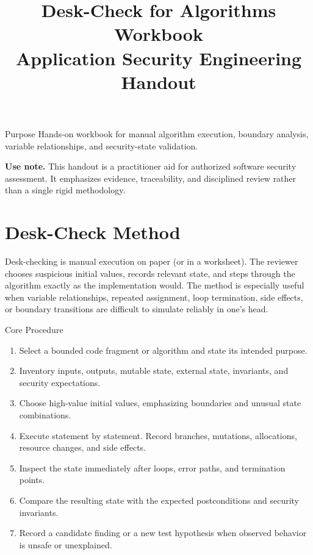 \documentclass[10pt]{article}
\title{\textbf{Desk-Check for Algorithms Workbook}\\\large Application Security Engineering Handout}
\author{}
\date{}
\begin{document}
\maketitle
\thispagestyle{empty}
\begin{keybox}{Purpose}
Hands-on workbook for manual algorithm execution, boundary analysis, variable relationships, and security-state validation.
\end{keybox}
\vfill
\noindent\textbf{Use note.} This handout is a practitioner aid for authorized software security assessment. It emphasizes evidence, traceability, and disciplined review rather than a single rigid methodology.
\newpage
\tableofcontents
\newpage

\section{Desk-Check Method}
Desk-checking is manual execution on paper (or in a worksheet). The reviewer chooses suspicious initial values, records relevant state, and steps through the algorithm exactly as the implementation would. The method is especially useful when variable relationships, repeated assignment, loop termination, side effects, or boundary transitions are difficult to simulate reliably in one's head.

\begin{keybox}{Core Procedure}
\begin{enumerate}
\item Select a bounded code fragment or algorithm and state its intended purpose.
\item Inventory inputs, outputs, mutable state, external state, invariants, and security expectations.
\item Choose high-value initial values, emphasizing boundaries and unusual state combinations.
\item Execute statement by statement. Record branches, mutations, allocations, resource changes, and side effects.
\item Inspect the state immediately after loops, error paths, and termination points.
\item Compare the resulting state with the expected postconditions and security invariants.
\item Record a candidate finding or a new test hypothesis when observed behavior is unsafe or unexplained.
\end{enumerate}
\end{keybox}
\end{document}
